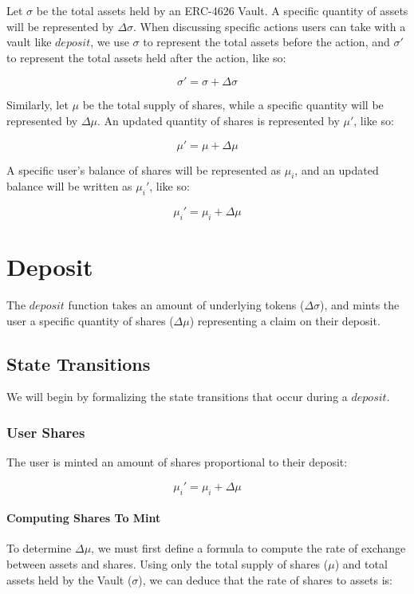 \documentclass{article}
\begin{document}
Let $\sigma$ be the total assets held by an ERC-4626 Vault. A specific quantity of assets will be represented by $\Delta\sigma$. When discussing specific actions users can take with a vault like $deposit$, we use $\sigma$ to represent the total assets before the action, and $\sigma'$ to represent the total assets held after the action, like so:

$$ \sigma' = \sigma + \Delta\sigma $$

Similarly, let $\mu$ be the total supply of shares, while a specific quantity will be represented by $\Delta\mu$. An updated quantity of shares is represented by $\mu'$, like so:

$$ \mu' = \mu + \Delta\mu $$

A specific user's balance of shares will be represented as $\mu_i$, and an updated balance will be written as $\mu_i'$, like so:

$$ \mu_i' = \mu_i + \Delta\mu $$

\section{Deposit}

The $deposit$ function takes an amount of underlying tokens ($
\Delta\sigma$), and mints the user a specific quantity of shares ($\Delta\mu$) representing a claim on their deposit.

\subsection{State Transitions}

We will begin by formalizing the state transitions that occur during a $deposit$.

\subsubsection{User Shares}

The user is minted an amount of shares proportional to their deposit:

$$ \mu_i' = \mu_i + \Delta\mu $$

\paragraph{Computing Shares To Mint}

To determine $\Delta\mu$, we must first define a formula to compute the rate of exchange between assets and shares. Using only the total supply of shares ($\mu$) and total assets held by the Vault ($\sigma$), we can deduce that the rate of shares to assets is:
\end{document}
